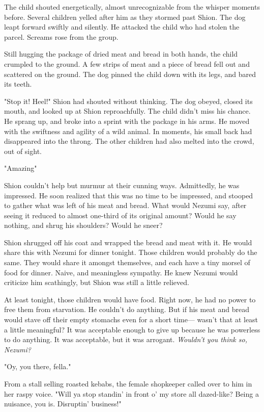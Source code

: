 The child shouted energetically, almost unrecognizable from the whisper
moments before. Several children yelled after him as they stormed past
Shion. The dog leapt forward swiftly and silently. He attacked the child
who had stolen the parcel. Screams rose from the group.

Still hugging the package of dried meat and bread in both hands, the
child crumpled to the ground. A few strips of meat and a piece of bread
fell out and scattered on the ground. The dog pinned the child down with
its legs, and bared its teeth.

"Stop it! Heel!" Shion had shouted without thinking. The dog obeyed,
closed its mouth, and looked up at Shion reproachfully. The child didn't
miss his chance. He sprang up, and broke into a sprint with the package
in his arms. He moved with the swiftness and agility of a wild animal.
In moments, his small back had disappeared into the throng. The other
children had also melted into the crowd, out of sight.

"Amazing\el "

Shion couldn't help but murmur at their cunning ways. Admittedly, he was
impressed. He soon realized that this was no time to be impressed, and
stooped to gather what was left of his meat and bread. What would Nezumi
say, after seeing it reduced to almost one-third of its original amount?
Would he say nothing, and shrug his shoulders? Would he sneer?

Shion shrugged off his coat and wrapped the bread and meat with it. He
would share this with Nezumi for dinner tonight. Those children would
probably do the same. They would share it amongst themselves, and each
have a tiny morsel of food for dinner. Naive, and meaningless sympathy.
He knew Nezumi would criticize him scathingly, but Shion was still a
little relieved.

At least tonight, those children would have food. Right now, he had no
power to free them from starvation. He couldn't do anything. But if his
meat and bread would stave off their empty stomachs even for a short
time--- wasn't that at least a little meaningful? It was acceptable enough
to give up because he was powerless to do anything. It was acceptable,
but it was arrogant. \emph{Wouldn't you think so, Nezumi?}

"Oy, you there, fella."

From a stall selling roasted kebabs, the female shopkeeper called over
to him in her raspy voice. "Will ya stop standin' in front o' my store
all dazed-like? Being a nuisance, you is. Disruptin' business!"

